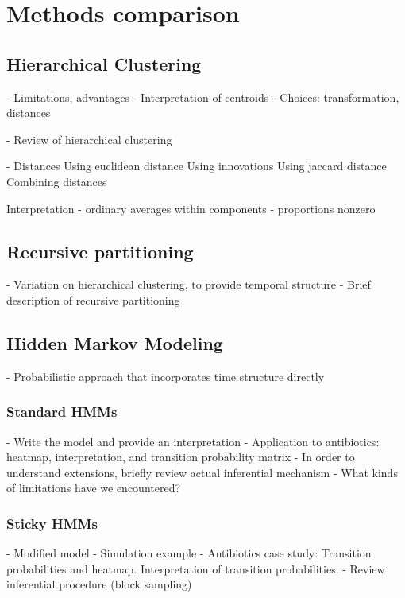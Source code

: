 \documentclass{report}
\begin{document}
\section{Methods comparison}

\subsection{Hierarchical Clustering}

- Limitations, advantages
- Interpretation of centroids
- Choices: transformation, distances

- Review of hierarchical clustering

- Distances
Using euclidean distance
Using innovations
Using jaccard distance
Combining distances

Interpretation
- ordinary averages within components
- proportions nonzero

\subsection{Recursive partitioning}

- Variation on hierarchical clustering, to provide temporal structure
- Brief description of recursive partitioning

\subsection{Hidden Markov Modeling}

- Probabilistic approach that incorporates time structure directly

\subsubsection{Standard HMMs}

- Write the model and provide an interpretation
- Application to antibiotics: heatmap, interpretation, and transition
probability matrix
- In order to understand extensions, briefly review actual inferential mechanism
- What kinds of limitations have we encountered?

\subsubsection{Sticky HMMs}

- Modified model
- Simulation example
- Antibiotics case study: Transition probabilities and heatmap. Interpretation
of transition probabilities.
- Review inferential procedure (block sampling)
\end{document}
